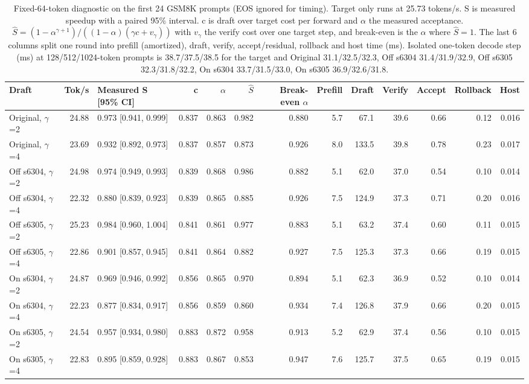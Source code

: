 \begin{table}[!htb]
\centering
\scriptsize
\setlength{\tabcolsep}{3.5pt}
\caption{Fixed-64-token diagnostic on the first 24 GSM8K prompts (EOS ignored for timing). Target only runs at 25.73 tokens/s. S is measured speedup with a paired 95\% interval. c is draft over target cost per forward and $\alpha$ the measured acceptance. $\hat S=(1-\alpha^{\gamma+1})/((1-\alpha)(\gamma c+v_\gamma))$ with $v_\gamma$ the verify cost over one target step, and break-even is the $\alpha$ where $\hat S=1$. The last 6 columns split one round into prefill (amortized), draft, verify, accept/residual, rollback and host time (ms). Isolated one-token decode step (ms) at 128/512/1024-token prompts is 38.7/37.5/38.5 for the target and Original 31.1/32.5/32.3, Off s6304 31.4/31.9/32.9, Off s6305 32.3/31.8/32.2, On s6304 33.7/31.5/33.0, On s6305 36.9/32.6/31.8.}
\label{tab:t3speedup}
\begin{adjustbox}{max width=\linewidth}
\begin{tabular}{lrlrrrrrrrrrr}
\toprule
Draft & Tok/s & Measured S [95\% CI] & c & $\alpha$ & $\hat S$ & Break-even $\alpha$ & Prefill & Draft & Verify & Accept & Rollback & Host \\
\midrule
Original, $\gamma$=2 & 24.88 & 0.973 [0.941, 0.999] & 0.837 & 0.863 & 0.982 & 0.880 & 5.7 & 67.1 & 39.6 & 0.66 & 0.12 & 0.016 \\
Original, $\gamma$=4 & 23.69 & 0.932 [0.892, 0.973] & 0.837 & 0.857 & 0.873 & 0.926 & 8.0 & 133.5 & 39.8 & 0.78 & 0.23 & 0.017 \\
Off s6304, $\gamma$=2 & 24.98 & 0.974 [0.949, 0.993] & 0.839 & 0.868 & 0.986 & 0.882 & 5.1 & 62.0 & 37.0 & 0.54 & 0.10 & 0.014 \\
Off s6304, $\gamma$=4 & 22.32 & 0.880 [0.839, 0.923] & 0.839 & 0.865 & 0.885 & 0.926 & 7.5 & 124.9 & 37.3 & 0.71 & 0.20 & 0.016 \\
Off s6305, $\gamma$=2 & 25.23 & 0.984 [0.960, 1.004] & 0.841 & 0.861 & 0.977 & 0.883 & 5.1 & 63.2 & 37.4 & 0.60 & 0.11 & 0.015 \\
Off s6305, $\gamma$=4 & 22.86 & 0.901 [0.857, 0.945] & 0.841 & 0.864 & 0.882 & 0.927 & 7.5 & 125.3 & 37.3 & 0.66 & 0.19 & 0.015 \\
On s6304, $\gamma$=2 & 24.87 & 0.969 [0.946, 0.992] & 0.856 & 0.865 & 0.970 & 0.894 & 5.1 & 62.3 & 36.9 & 0.52 & 0.10 & 0.014 \\
On s6304, $\gamma$=4 & 22.23 & 0.877 [0.834, 0.917] & 0.856 & 0.859 & 0.860 & 0.934 & 7.4 & 126.8 & 37.9 & 0.66 & 0.20 & 0.015 \\
On s6305, $\gamma$=2 & 24.54 & 0.957 [0.934, 0.980] & 0.883 & 0.872 & 0.958 & 0.913 & 5.2 & 62.9 & 37.4 & 0.56 & 0.10 & 0.015 \\
On s6305, $\gamma$=4 & 22.83 & 0.895 [0.859, 0.928] & 0.883 & 0.867 & 0.853 & 0.947 & 7.6 & 125.7 & 37.5 & 0.65 & 0.19 & 0.015 \\
\bottomrule
\end{tabular}
\end{adjustbox}
\end{table}
